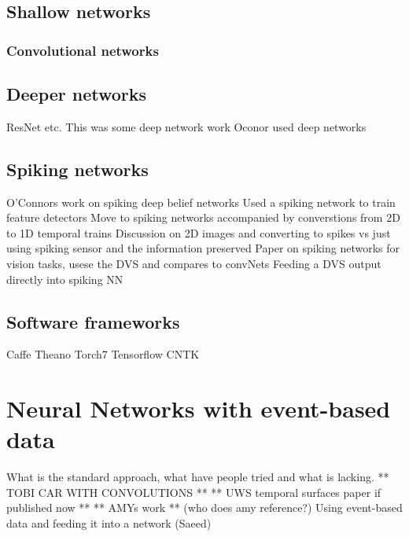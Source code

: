 

\subsection{Shallow networks}  


\subsubsection{Convolutional networks}

\subsection{Deeper networks}   %
ResNet etc. %
This was some deep network work \cite{pedroni2013neuromorphic}
Oconor used deep networks \cite{OConnor2013}

\subsection{Spiking networks}    %
O'Connors work on spiking deep belief networks \cite{OConnor2013}
Used a spiking network to train feature detectors \cite{afshar2016investigation}
Move to spiking networks accompanied by converstions from 2D to 1D temporal trains \cite{afshar2013ripple}
Discussion on 2D images and converting to spikes vs just using spiking sensor and the information preserved \cite{akolkar2015can}
Paper on spiking networks for vision tasks, usese the DVS and compares to convNets \cite{martin2015spiking}
Feeding a DVS output directly into spiking NN \cite{Bichler}

\subsection{Software frameworks}   %
Caffe\cite{jia2014caffe} Theano Torch7 Tensorflow CNTK

\section{Neural Networks with event-based data}
What is the standard approach, what have people tried and what is lacking. \cite{OConnor2013}  ** TOBI CAR WITH CONVOLUTIONS ** ** UWS temporal surfaces paper if published now ** ** AMYs work ** (who does amy reference?)
Using event-based data and feeding it into a network (Saeed) \cite{afshar2016investigation}

